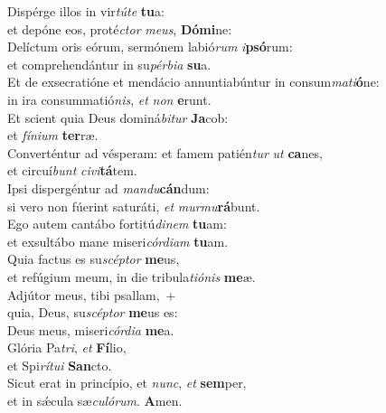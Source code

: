 \evenverse Dispérge illos in vir\textit{tú}\textit{te} \textbf{tu}a:~\*\\
\evenverse et depóne eos, proté\textit{ctor} \textit{me}\textit{us}, \textbf{Dó}\textbf{mi}ne:\\
\oddverse Delíctum oris eórum, sermónem labió\textit{rum} \textit{i}\textbf{psó}rum:~\*\\
\oddverse et comprehendántur in su\textit{pér}\textit{bi}\textit{a} \textbf{su}a.\\
\evenverse Et de exsecratióne et mendácio annuntiabúntur in consum\textit{ma}\textit{ti}\textbf{ó}ne:~\*\\
\evenverse in ira consummatió\textit{nis}, \textit{et} \textit{non} \textbf{e}runt.\\
\oddverse Et scient quia Deus dominá\textit{bi}\textit{tur} \textbf{Ja}cob:~\*\\
\oddverse et \textit{fí}\textit{ni}\textit{um} \textbf{ter}ræ.\\
\evenverse Converténtur ad vésperam: et famem patién\textit{tur} \textit{ut} \textbf{ca}nes,~\*\\
\evenverse et circuí\textit{bunt} \textit{ci}\textit{vi}\textbf{tá}tem.\\
\oddverse Ipsi dispergéntur ad \textit{man}\textit{du}\textbf{cán}dum:~\*\\
\oddverse si vero non fúerint saturáti, \textit{et} \textit{mur}\textit{mu}\textbf{rá}bunt.\\
\evenverse Ego autem cantábo fortitú\textit{di}\textit{nem} \textbf{tu}am:~\*\\
\evenverse et exsultábo mane miseri\textit{cór}\textit{di}\textit{am} \textbf{tu}am.\\
\oddverse Quia factus es su\textit{scép}\textit{tor} \textbf{me}us,~\*\\
\oddverse et refúgium meum, in die tribula\textit{ti}\textit{ó}\textit{nis} \textbf{me}æ.\\
\evenverse Adjútor meus, tibi psallam,~+\\
\evenverse  quia, Deus, su\textit{scép}\textit{tor} \textbf{me}us es:~\*\\
\evenverse Deus meus, miseri\textit{cór}\textit{di}\textit{a} \textbf{me}a.\\
\oddverse Glória Pa\textit{tri}, \textit{et} \textbf{Fí}lio,~\*\\
\oddverse et Spi\textit{rí}\textit{tu}\textit{i} \textbf{San}cto.\\
\evenverse Sicut erat in princípio, et \textit{nunc}, \textit{et} \textbf{sem}per,~\*\\
\evenverse et in sǽcula sæ\textit{cu}\textit{ló}\textit{rum}. \textbf{A}men.\\
